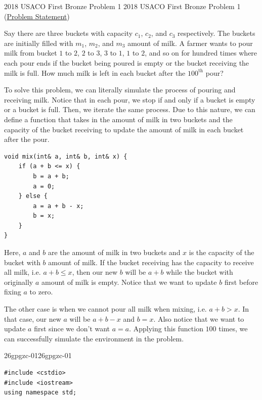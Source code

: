 \documentclass[../../../main.tex]{subfiles}
\begin{document}
\begin{problem}
{2018 USACO First Bronze Problem 1}
{2018 USACO First Bronze Problem 1}
(\href{https://usaco.org/index.php?page=viewproblem2&cpid=855}{Problem Statement})

Say there are three buckets with capacity $c_1$, $c_2$, and $c_3$
respectively. The buckets are initially filled with $m_1$, $m_2$,
and $m_3$ amount of milk. A farmer wants to pour milk from bucket
$1$ to $2$, $2$ to $3$, $3$ to $1$, $1$ to $2$, and so on for
hundred times where each pour ends if the bucket being poured is
empty or the bucket receiving the milk is full. How much milk is
left in each bucket after the $100^\text{th}$ pour?
\end{problem}
\begin{solution}
To solve this problem, we can literally simulate the process of
pouring and receiving milk. Notice that in each pour, we stop
if and only if a bucket is empty or a bucket is full. Then, we
iterate the same process. Due to this nature, we can define a
function that takes in the amount of milk in two buckets and the
capacity of the bucket receiving to update the amount of milk in
each bucket after the pour.

\begin{basicboxSolution}
\begin{lstlisting}[style=basic]
void mix(int& a, int& b, int& x) {
    if (a + b <= x) {
        b = a + b;
        a = 0;
    } else {
        a = a + b - x;
        b = x;
    }
}
\end{lstlisting}
\end{basicboxSolution}

Here, $a$ and $b$ are the amount of milk in two buckets and $x$
is the capacity of the bucket with $b$ amount of milk. If the
bucket receiving has the capacity to receive all milk, i.e.
$a + b \leq x$, then our new $b$ will be $a + b$ while the bucket
with originally $a$ amount of milk is empty. Notice that we want
to update $b$ first before fixing $a$ to zero.

The other case is when we cannot pour all milk when mixing, i.e.
$a + b > x$. In that case, our new $a$ will be $a + b - x$ and
$b = x$. Also notice that we want to update $a$ first since we don't
want $a = a$. Applying this function $100$ times, we can successfully
simulate the environment in the problem.

\begin{cppboxSolution}{26gpgzc-01}{26gpgzc-01}
\begin{lstlisting}[style=cppstyle]
#include <cstdio>
#include <iostream>
using namespace std;


\end{lstlisting}
\end{cppboxSolution}
\end{solution}
\end{document}
